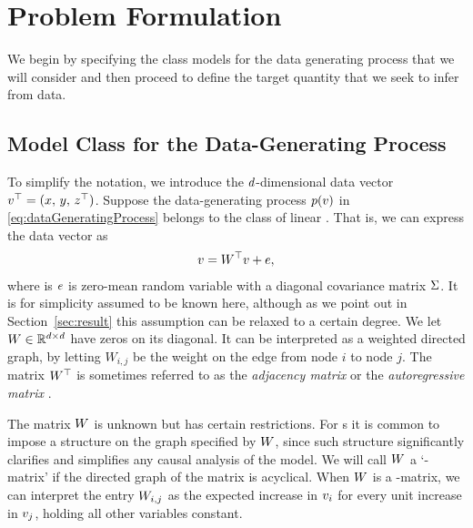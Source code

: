 
\section{Problem Formulation}

We begin by specifying the class models for the data generating process that we will consider and then proceed to define the target quantity that we seek to infer from data.

\subsection{Model Class for the Data-Generating Process}

To simplify the notation, we introduce the $d$-dimensional data vector $v^\top = (x ,\, y ,\, z^\top)$. Suppose the data-generating process $p(v)$ in \eqref{eq:dataGeneratingProcess} belongs to the class of linear \scm. That is, we can express the data vector as
\begin{align}
    \label{eq:sem:linear_sem}
    v = W^\top v + e,
\end{align}
where is $e$ is zero-mean random variable with a diagonal covariance matrix $\Sigma$. It is for simplicity assumed to be known here, although as we point out in Section~\ref{sec:result} this assumption can be relaxed to a certain degree.  We let $W\in \mathbb R^{d\times d}$ have zeros on its diagonal. It can be interpreted as a weighted directed graph, by letting $W_{i,j}$ be the weight on the edge from node $i$ to node $j$.
The matrix $W^\top$ is sometimes referred to as the \emph{adjacency matrix} \citep{shimizu_directlingam_2011} or the \emph{autoregressive matrix} \citep{loh_high-dimensional_2014}.

The matrix $W$ is unknown but has certain restrictions. For \scm{}s it is common to impose a \DAG{} structure on the graph specified by $W$, since such structure significantly clarifies and simplifies any causal analysis of the model.
We will call $W$ a `\DAG{}-matrix' if the directed graph of the matrix is acyclical.
When $W$ is a \DAG{}-matrix, we can interpret the entry $W_{i,j}$ as the expected increase in $v_i$ for every unit increase in $v_j$, holding all other variables constant.

